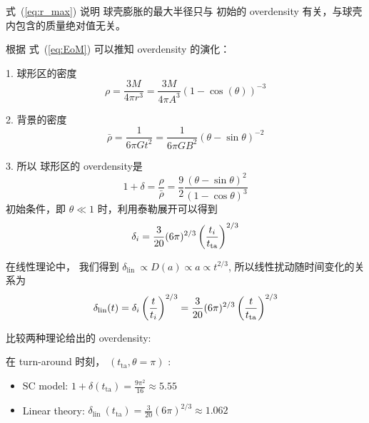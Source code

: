 \documentclass[12pt]{ctexart}
\newcommand{\refeq}[1]{式~(\ref{#1})}
\begin{document}
\refeq{eq:r_max} 说明 球壳膨胀的最大半径只与 初始的 overdensity 有关，与球壳内包含的质量绝对值无关。

根据 \refeq{eq:EoM} 可以推知 overdensity 的演化：

1. 球形区的密度
\begin{equation}
    \rho=\frac{3 M}{4 \pi r^{3}}=\frac{3 M}{4 \pi A^{3}}(1-\cos (\theta))^{-3}
\end{equation}

2. 背景的密度
\begin{equation}
    \bar{\rho}=\frac{1}{6 \pi G t^{2}}=\frac{1}{6 \pi G B^{2}}(\theta-\sin \theta)^{-2}
\end{equation}

3. 所以 球形区的 overdensity是
\begin{equation}
    1+\delta=\frac{\rho}{\bar{\rho}}=\frac{9}{2} \frac{(\theta-\sin \theta)^{2}}{(1-\cos \theta)^{3}}
\end{equation}
初始条件，即 $\theta \ll 1$ 时，利用泰勒展开可以得到
\begin{equation}
    \delta_{i}=\frac{3}{20}(6 \pi)^{2 / 3}\left(\frac{t_{i}}{t_{\rm{ta} }}\right)^{2 / 3}
\end{equation}

在线性理论中， 我们得到 $\delta_{\text {lin }} \propto D(a) \propto a \propto t^{2 / 3}$, 所以线性扰动随时间变化的关系为
\begin{eqnarray}
    \delta_{\operatorname{lin}}(t)=\delta_{i}\left(\frac{t}{t_{i}}\right)^{2 / 3}=\frac{3}{20}(6 \pi)^{2 / 3}\left(\frac{t}{t_{\rm{ta} }}\right)^{2 / 3}
\end{eqnarray}

比较两种理论给出的 overdensity:

在 turn-around 时刻，
$\left(t_{\mathrm{ta}} , \theta=\pi\right)$ :
\begin{itemize}
    \item $\mathrm{SC}$ model: $1+\delta\left(t_{\mathrm{ta}}\right)=\frac{9 \pi^{2}}{16} \approx 5.55$
    \item Linear theory: $\delta_{\text {lin }}\left(t_{\mathrm{ta}}\right)=\frac{3}{20}(6 \pi)^{2 / 3} \approx 1.062$
\end{itemize}
\end{document}
